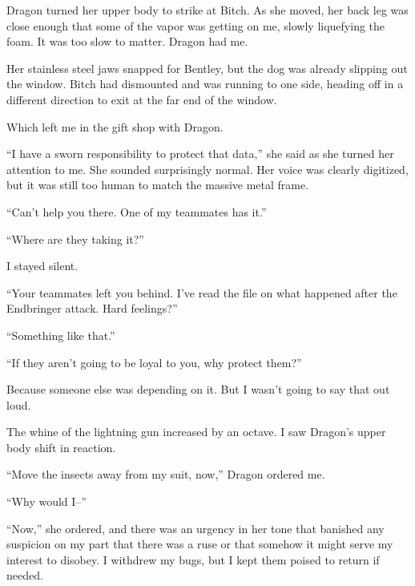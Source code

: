 Dragon turned her upper body to strike at Bitch.  As she moved, her back leg was close enough that some of the vapor was getting on me, slowly liquefying the foam.  It was too slow to matter.  Dragon had me.



Her stainless steel jaws snapped for Bentley, but the dog was already slipping out the window.  Bitch had dismounted and was running to one side, heading off in a different direction to exit at the far end of the window.



Which left me in the gift shop with Dragon.



``I have a sworn responsibility to protect that data,'' she said as she turned her attention to me.  She sounded surprisingly normal.  Her voice was clearly digitized, but it was still too human to match the massive metal frame.



``Can't help you there.  One of my teammates has it.''



``Where are they taking it?''



I stayed silent.



``Your teammates left you behind.  I've read the file on what happened after the Endbringer attack.  Hard feelings?''



``Something like that.''



``If they aren't going to be loyal to you, why protect them?''



Because someone else was depending on it.  But I wasn't going to say that out loud.



The whine of the lightning gun increased by an octave.  I saw Dragon's upper body shift in reaction.



``Move the insects away from my suit, now,'' Dragon ordered me.



``Why would I--''



``Now,'' she ordered, and there was an urgency in her tone that banished any suspicion on my part that there was a ruse or that somehow it might serve my interest to disobey.  I withdrew my bugs, but I kept them poised to return if needed.



